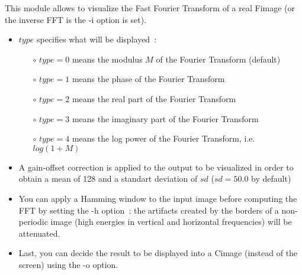 This module allows to visualize the Fast Fourier Transform of a real Fimage 
(or the inverse FFT is the -i option is set).
\begin{itemize}
\item $type$ specifies what will be displayed~:
\begin{itemize}
\item[$\circ$] $type=0$ means the modulus $M$ of the Fourier Transform (default)
\item[$\circ$] $type=1$ means the phase of the Fourier Transform
\item[$\circ$] $type=2$ means the real part of the Fourier Transform
\item[$\circ$] $type=3$ means the imaginary part of the Fourier Transform
\item[$\circ$] $type=4$ means the log power of the Fourier Transform, i.e. $log(1+M)$
\end{itemize}
\item A gain-offset correction is applied to the output to be visualized
in order to obtain a mean of 128 and a standart deviation of $sd$ 
($sd = 50.0$ by default)
\item You can apply a Hamming window to the input image before computing the
FFT by setting the -h option~: the artifacts created by the borders of a
non-periodic image (high energies in vertical and horizontal frequencies)
will be attenuated.
\item Last, you can decide the result to be displayed into a Cimage (instead 
of the screen) using the -o option.
\end{itemize}

